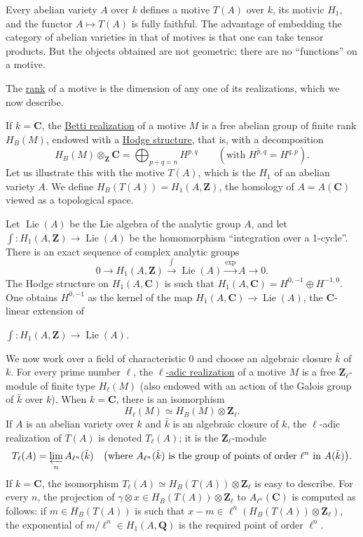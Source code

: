 \documentclass[10pt,a4paper]{article}
\newcommand{\Z}{\mathbf Z}
\newcommand{\Q}{\mathbf Q}
\newcommand{\C}{\mathbf C}
\begin{document}
Every abelian variety $A$ over $k$ defines a motive $T(A)$ over $k$, its motivic $H_1$, and the functor $A\mapsto T(A)$ is fully faithful. The advantage of embedding the category of abelian varieties in that of motives is that one can take tensor products. But the objects obtained are not geometric: there are no ``functions'' on a motive.

The \uline{rank} of a motive is the dimension of any one of its realizations, which we now describe.

If $k=\C$, the \uline{Betti realization} of a motive $M$ is a free abelian group of finite rank $H_B(M)$, endowed with a \uline{Hodge structure}, that is, with a decomposition
\[
H_B(M)\otimes_{\Z}\C=\bigoplus_{p+q=n}H^{p,q}\qquad(\text{with }\overline{H^{p,q}}=H^{q,p}).
\]
Let us illustrate this with the motive $T(A)$, which is the $H_1$ of an abelian variety $A$. We define $H_B(T(A))=H_1(A,\Z)$, the homology of $A=A(\C)$ viewed as a topological space.

Let $\operatorname{Lie}(A)$ be the Lie algebra of the analytic group $A$, and let $\int:H_1(A,\Z)\to\operatorname{Lie}(A)$ be the homomorphism ``integration over a 1-cycle''. There is an exact sequence of complex analytic groups
\[
0\longrightarrow H_1(A,\Z)\xrightarrow{\int}\operatorname{Lie}(A)\xrightarrow{\exp}A\longrightarrow0.
\]
The Hodge structure on $H_1(A,\C)$ is such that $H_1(A,\C)=H^{0,-1}\oplus H^{-1,0}$. One obtains $H^{0,-1}$ as the kernel of the map $H_1(A,\C)\to\operatorname{Lie}(A)$, the $\C$-linear extension of


\newpage


$\int:H_1(A,\Z)\to\operatorname{Lie}(A)$.

We now work over a field of characteristic $0$ and choose an algebraic closure $\bar k$ of $k$. For every prime number $\ell$, the \uline{$\ell$-adic realization} of a motive $M$ is a free $\Z_\ell$-module of finite type $H_\ell(M)$ (also endowed with an action of the Galois group of $\bar k$ over $k$). When $k=\C$, there is an isomorphism
\[
H_\ell(M)\simeq H_B(M)\otimes\Z_\ell.
\]
If $A$ is an abelian variety over $k$ and $\bar k$ is an algebraic closure of $k$, the $\ell$-adic realization of $T(A)$ is denoted $T_\ell(A)$; it is the $\Z_\ell$-module
\[
T_\ell(A)=\varprojlim_n A_{\ell^n}(\bar k)
\quad\bigl(\text{where }A_{\ell^n}(\bar k)\text{ is the group of points of order }\ell^n\text{ in }A(\bar k)\bigr).
\]
If $k=\C$, the isomorphism $T_\ell(A)\simeq H_B(T(A))\otimes\Z_\ell$ is easy to describe. For every $n$, the projection of $\gamma\otimes x\in H_B(T(A))\otimes\Z_\ell$ to $A_{\ell^n}(\C)$ is computed as follows: if $m\in H_B(T(A))$ is such that $x-m\in\ell^n(H_B(T(A))\otimes\Z_\ell)$, the exponential of $m/\ell^n\in H_1(A,\Q)$ is the required point of order $\ell^n$.
\end{document}

